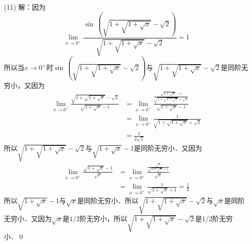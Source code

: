 \medskip
(11) 解：因为
\begin{equation}
    \lim_{x \to 0^+} \displaystyle\frac{\sin \, \left(\displaystyle\sqrt{1+\displaystyle\sqrt{1+\displaystyle\sqrt{x}}}-\displaystyle\sqrt{2}\right)}{\displaystyle\sqrt{1+\displaystyle\sqrt{1+\displaystyle\sqrt{x}}}-\displaystyle\sqrt{2}} = 1
\end{equation}
所以当$x \to 0^+$时$\sin \, \left(\displaystyle\sqrt{1+\displaystyle\sqrt{1+\displaystyle\sqrt{x}}}-\displaystyle\sqrt{2}\right)$与$\displaystyle\sqrt{1+\displaystyle\sqrt{1+\displaystyle\sqrt{x}}}-\displaystyle\sqrt{2}$是同阶无穷小，又因为
\begin{align}
    \lim_{x \to 0^+} \displaystyle\frac{\displaystyle\sqrt{1+\displaystyle\sqrt{1+\displaystyle\sqrt{x}}}-\displaystyle\sqrt{2}}{\displaystyle\sqrt{1+\sqrt{x}}-1} &= \lim_{x \to 0^+} \displaystyle\frac{\displaystyle\frac{\displaystyle\sqrt{1+\displaystyle\sqrt{x}}-1}{\displaystyle\sqrt{1+\displaystyle\sqrt{1+\displaystyle\sqrt{x}}}+\displaystyle\sqrt{2}}}{\displaystyle\sqrt{1+\displaystyle\sqrt{x}}-1} \\
    &= \lim_{x \to 0^+} \displaystyle\frac{1}{\displaystyle\sqrt{1+\displaystyle\sqrt{1+\displaystyle\sqrt{x}}}+\displaystyle\sqrt{2}} \\
    &= \frac{1}{2\displaystyle\sqrt{2}}
\end{align}
所以$\displaystyle\sqrt{1+\displaystyle\sqrt{1+\displaystyle\sqrt{x}}}-\displaystyle\sqrt{2}$与$\displaystyle\sqrt{1+\displaystyle\sqrt{x}}-1$是同阶无穷小．又因为
\begin{align}
    \lim_{x \to 0^+} \displaystyle\frac{\displaystyle\sqrt{1+\displaystyle\sqrt{x}}-1}{\displaystyle\sqrt{x}} &= \lim_{x \to 0^+} \displaystyle\frac{\displaystyle\frac{\displaystyle\sqrt{x}}{\displaystyle\sqrt{1+\displaystyle\sqrt{x}}+1}}{\displaystyle\sqrt{x}} \\
    &= \lim_{x \to 0^+} \displaystyle\frac{1}{\displaystyle\sqrt{1+\displaystyle\sqrt{x}}+1} = \frac{1}{2}
\end{align}
所以$\displaystyle\sqrt{1+\displaystyle\sqrt{x}}-1$与$\displaystyle\sqrt{x}$是同阶无穷小．所以$\displaystyle\sqrt{1+\displaystyle\sqrt{1+\displaystyle\sqrt{x}}}-\displaystyle\sqrt{2}$与$\sqrt{x}$是同阶无穷小．又因为$\displaystyle\sqrt{x}$是$1/2$阶无穷小，所以$\displaystyle\sqrt{1+\displaystyle\sqrt{1+\displaystyle\sqrt{x}}}-\displaystyle\sqrt{2}$是$1/2$阶无穷小．\qed


